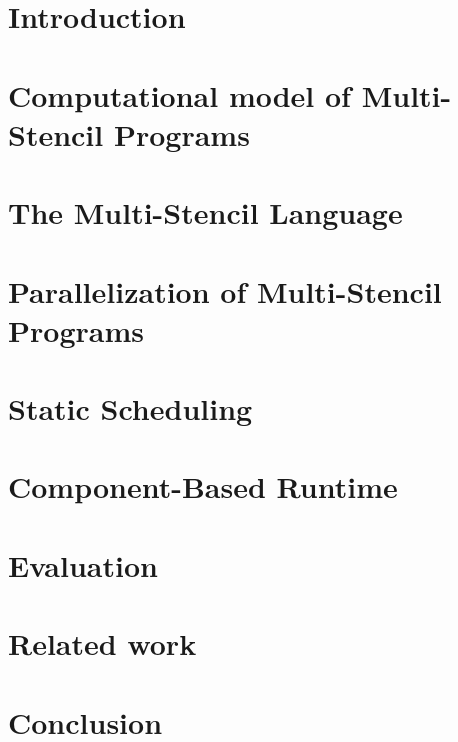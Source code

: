 \documentclass[twoside]{article}
\begin{document}
\makeRR   %

\tableofcontents

\section{Introduction}
\label{sect:introduction}
\section{Computational model of Multi-Stencil Programs}
\label{sect:formalism}

\section{The Multi-Stencil Language}
\label{sect:msl}

\section{Parallelization of Multi-Stencil Programs}
\label{sect:parallelism}

\section{Static Scheduling}
\label{sect:msp}

\section{Component-Based Runtime}
\label{sect:component}

\section{Evaluation}
\label{sect:eval}

\section{Related work}
\label{sect:rel}

\section{Conclusion}
\label{sect:concl}

\label{sect:bib}


\end{document}
